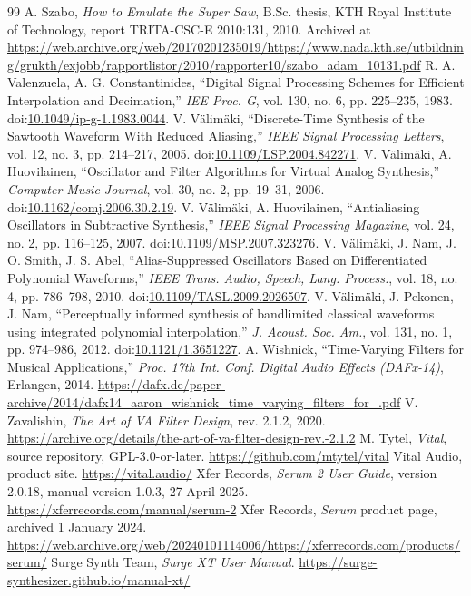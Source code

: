 \documentclass[conference]{IEEEtran}
\begin{document}
\begin{thebibliography}{99}
 A. Szabo, \emph{How to Emulate the Super Saw}, B.Sc. thesis, KTH Royal Institute of Technology, report TRITA-CSC-E 2010:131, 2010. Archived at \url{https://web.archive.org/web/20170201235019/https://www.nada.kth.se/utbildning/grukth/exjobb/rapportlistor/2010/rapporter10/szabo_adam_10131.pdf}
 R. A. Valenzuela, A. G. Constantinides, ``Digital Signal Processing Schemes for Efficient Interpolation and Decimation,'' \emph{IEE Proc. G}, vol. 130, no. 6, pp. 225–235, 1983. doi:\href{https://doi.org/10.1049/ip-g-1.1983.0044}{10.1049/ip-g-1.1983.0044}.
 V. Välimäki, ``Discrete-Time Synthesis of the Sawtooth Waveform With Reduced Aliasing,'' \emph{IEEE Signal Processing Letters}, vol. 12, no. 3, pp. 214–217, 2005. doi:\href{https://doi.org/10.1109/LSP.2004.842271}{10.1109/LSP.2004.842271}.
 V. Välimäki, A. Huovilainen, ``Oscillator and Filter Algorithms for Virtual Analog Synthesis,'' \emph{Computer Music Journal}, vol. 30, no. 2, pp. 19–31, 2006. doi:\href{https://doi.org/10.1162/comj.2006.30.2.19}{10.1162/comj.2006.30.2.19}.
 V. Välimäki, A. Huovilainen, ``Antialiasing Oscillators in Subtractive Synthesis,'' \emph{IEEE Signal Processing Magazine}, vol. 24, no. 2, pp. 116–125, 2007. doi:\href{https://doi.org/10.1109/MSP.2007.323276}{10.1109/MSP.2007.323276}.
 V. Välimäki, J. Nam, J. O. Smith, J. S. Abel, ``Alias-Suppressed Oscillators Based on Differentiated Polynomial Waveforms,'' \emph{IEEE Trans. Audio, Speech, Lang. Process.}, vol. 18, no. 4, pp. 786–798, 2010. doi:\href{https://doi.org/10.1109/TASL.2009.2026507}{10.1109/TASL.2009.2026507}.
 V. Välimäki, J. Pekonen, J. Nam, ``Perceptually informed synthesis of bandlimited classical waveforms using integrated polynomial interpolation,'' \emph{J. Acoust. Soc. Am.}, vol. 131, no. 1, pp. 974–986, 2012. doi:\href{https://doi.org/10.1121/1.3651227}{10.1121/1.3651227}.
 A. Wishnick, ``Time-Varying Filters for Musical Applications,'' \emph{Proc. 17th Int. Conf. Digital Audio Effects (DAFx-14)}, Erlangen, 2014. \url{https://dafx.de/paper-archive/2014/dafx14_aaron_wishnick_time_varying_filters_for_.pdf}
 V. Zavalishin, \emph{The Art of VA Filter Design}, rev. 2.1.2, 2020. \url{https://archive.org/details/the-art-of-va-filter-design-rev.-2.1.2}
 M. Tytel, \emph{Vital}, source repository, GPL-3.0-or-later. \url{https://github.com/mtytel/vital}
 Vital Audio, product site. \url{https://vital.audio/}
 Xfer Records, \emph{Serum 2 User Guide}, version 2.0.18, manual version 1.0.3, 27 April 2025. \url{https://xferrecords.com/manual/serum-2}
 Xfer Records, \emph{Serum} product page, archived 1 January 2024. \url{https://web.archive.org/web/20240101114006/https://xferrecords.com/products/serum/}
 Surge Synth Team, \emph{Surge XT User Manual}. \url{https://surge-synthesizer.github.io/manual-xt/}
\end{thebibliography}
\end{document}
